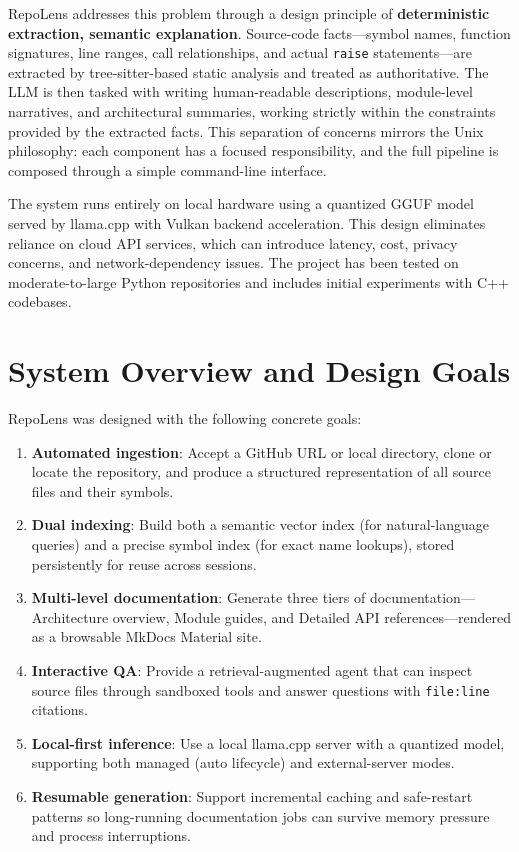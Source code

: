 \documentclass[10pt,twocolumn]{article}
\begin{document}
RepoLens addresses this problem through a design principle of \textbf{deterministic extraction, semantic explanation}. Source-code facts---symbol names, function signatures, line ranges, call relationships, and actual \texttt{raise} statements---are extracted by tree-sitter-based static analysis and treated as authoritative. The LLM is then tasked with writing human-readable descriptions, module-level narratives, and architectural summaries, working strictly within the constraints provided by the extracted facts. This separation of concerns mirrors the Unix philosophy: each component has a focused responsibility, and the full pipeline is composed through a simple command-line interface.

The system runs entirely on local hardware using a quantized GGUF model served by llama.cpp with Vulkan backend acceleration. This design eliminates reliance on cloud API services, which can introduce latency, cost, privacy concerns, and network-dependency issues. The project has been tested on moderate-to-large Python repositories and includes initial experiments with C++ codebases.

\section{System Overview and Design Goals}

RepoLens was designed with the following concrete goals:

\begin{enumerate}[nosep,leftmargin=*]
  \item \textbf{Automated ingestion}: Accept a GitHub URL or local directory, clone or locate the repository, and produce a structured representation of all source files and their symbols.
  \item \textbf{Dual indexing}: Build both a semantic vector index (for natural-language queries) and a precise symbol index (for exact name lookups), stored persistently for reuse across sessions.
  \item \textbf{Multi-level documentation}: Generate three tiers of documentation---Architecture overview, Module guides, and Detailed API references---rendered as a browsable MkDocs Material site.
  \item \textbf{Interactive QA}: Provide a retrieval-augmented agent that can inspect source files through sandboxed tools and answer questions with \texttt{file:line} citations.
  \item \textbf{Local-first inference}: Use a local llama.cpp server with a quantized model, supporting both managed (auto lifecycle) and external-server modes.
  \item \textbf{Resumable generation}: Support incremental caching and safe-restart patterns so long-running documentation jobs can survive memory pressure and process interruptions.
\end{enumerate}
\end{document}
